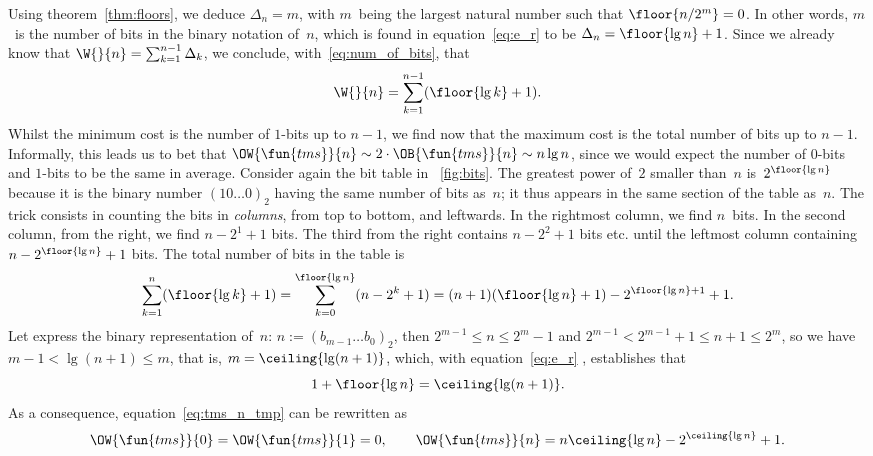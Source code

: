 Using theorem~\vref{thm:floors}, we deduce \(\Delta_n = m\), with
\(m\)~being the largest natural number such that \(\floor{n/2^m} =
0\). In other words, \(m\)~is the number of bits in the binary
notation of~\(n\), which is found in equation~\eqref{eq:e_r} to be
\(\Delta_n = \floor{\lg n} + 1\). Since we already know that \(\W{}{n}
= \sum_{k=1}^{n-1}\Delta_k\), we conclude,
with~\eqref{eq:num_of_bits}, that
\begin{equation}
\W{}{n} = \sum_{k=1}^{n-1}(\floor{\lg k}+1).
\label{eq:tms_n_tmp}
\end{equation}
Whilst the minimum cost is the number of \(1\)-bits up to \(n-1\), we
find now that the maximum cost is the total number of bits up to
\(n-1\). Informally, this leads us to bet that \(\OW{\fun{tms}}{n}
\sim 2 \cdot \OB{\fun{tms}}{n} \sim n\lg n\), since we would expect
the number of \(0\)-bits and \(1\)-bits to be the same in
average. Consider again the bit table in \fig~\vref{fig:bits}. The
greatest power of~\(2\) smaller than~\(n\) is~\(2^{\floor{\lg n}}\)
because it is the binary number \((10\dots0)_2\) having the same
number of bits as~\(n\); it thus appears in the same section of the
table as~\(n\). The trick consists in counting the bits in
\emph{columns}, from top to bottom, and leftwards. In the rightmost
column, we find \(n\)~bits. In the second column, from the right, we
find \(n-2^1+1\) bits. The third from the right contains \(n-2^2+1\)
bits etc. until the leftmost column containing \(n-2^{\floor{\lg
    n}}+1\) bits. The total number of bits in the table is
\begin{equation*}
\abovedisplayskip=2pt
\belowdisplayskip=2pt
\sum_{k=1}^{n}{\!(\floor{\lg k}+1)}
   = \sum_{k=0}^{\floor{\lg n}}{\!(n-2^k+1)}
   = (n + 1)(\floor{\lg n} + 1) - 2^{\floor{\lg n}+1} + 1.
\end{equation*}
Let express the binary representation of~\(n\): \(n := (b_{m-1}\dots
b_0)_2\), then \(2^{m-1} \leqslant n \leqslant 2^m - 1\) and \(2^{m-1}
< 2^{m-1} + 1 \leqslant n + 1 \leqslant 2^m\), so we have \(m-1 <
\lg(n+1) \leqslant m\), that is, \(m = \ceiling{\lg(n+1)}\), which,
with equation~\eqref{eq:e_r} , establishes that
\begin{equation*}
  1 + \floor{\lg n} = \ceiling{\lg(n+1)}.
\end{equation*}
As a consequence, equation~\eqref{eq:tms_n_tmp} can be rewritten as
\begin{equation}
\OW{\fun{tms}}{0} = \OW{\fun{tms}}{1} = 0,
\qquad
\OW{\fun{tms}}{n} = n\ceiling{\lg n} - 2^{\ceiling{\lg n}} + 1.
\label{eq:top}
\end{equation}
